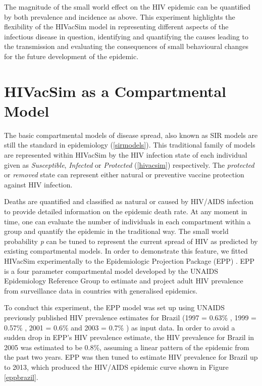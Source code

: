 The magnitude of the small world effect on the HIV epidemic can be quantified by both
prevalence and incidence as above. This experiment highlights the flexibility of the
HIVacSim model in representing different aspects of the infectious disease in question,
identifying and quantifying the causes leading to the transmission and evaluating the
consequences of small behavioural changes for the future development of the epidemic.


\section{HIVacSim as a Compartmental Model}\label{hivacsimsir}

The basic compartmental models of disease spread, also known as SIR models are still the
standard in epidemiology (\ref{sirmodels}). This traditional family of models are
represented within HIVacSim by the HIV infection state of each individual given as
\emph{Susceptible}, \emph{Infected} or \emph{Protected} (\ref{hivacsim}) respectively.
The \emph{protected} or \emph{removed} state can represent either natural or preventive
vaccine protection against HIV infection.

Deaths are quantified and classified as natural or caused by HIV/AIDS infection to
provide detailed information on the epidemic death rate. At any moment in time, one can
evaluate the number of individuals in each compartment within a group and quantify the
epidemic in the traditional way. The small world probability \emph{p} can be tuned to
represent the current spread of HIV as predicted by existing compartmental models. In
order to demonstrate this feature, we fitted HIVacSim experimentally to the Epidemiologic
Projection Package (EPP) \cite{UNAIDSRG2002,Ghys2004}. EPP is a four parameter
compartmental model developed by the UNAIDS Epidemiology Reference Group to estimate and
project adult HIV prevalence from surveillance data in countries with generalised
epidemics.

To conduct this experiment, the EPP model was set up using UNAIDS previously published
HIV prevalence estimates for Brazil (1997 = 0.63\% \cite{UNAIDS1998}, 1999 = 0.57\%
\cite{UNAIDS2000}, 2001 = 0.6\% \cite{UNAIDS2002} and 2003 = 0.7\% \cite{UNAIDS2004}) as
input data. In order to avoid a sudden drop in EPP's HIV prevalence estimate, the HIV
prevalence for Brazil in 2005 was estimated to be 0.8\%, assuming a linear pattern of the
epidemic from the past two years. EPP was then tuned to estimate HIV prevalence for
Brazil up to 2013, which produced the HIV/AIDS epidemic curve shown in Figure
\ref{eppbrazil}. \newpage

